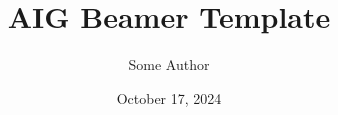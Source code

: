 \documentclass[aspectratio=169]{beamer} %
\title{AIG Beamer Template}
\author[S. Author]{Some Author}
\institute{Artificial Intelligence Group,\\
University of Hagen, Germany}
\date{October 17, 2024}
\begin{document}

\begin{frame}
  \titlepage
\end{frame}
\nologo











\end{document}
